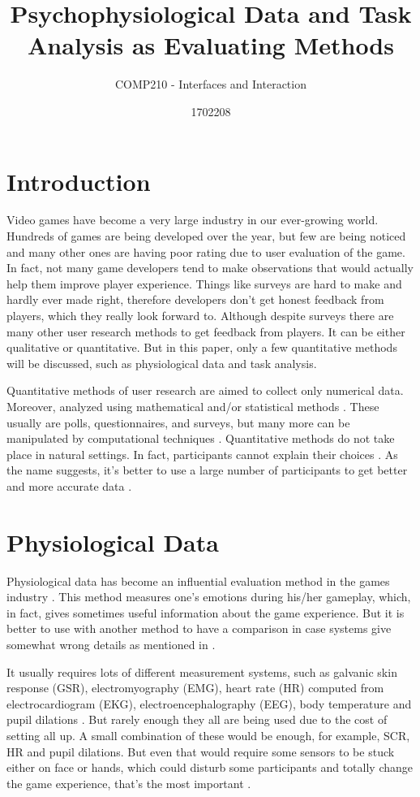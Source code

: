 \documentclass{scrartcl}
\title{Psychophysiological Data and Task Analysis as Evaluating Methods}
\subtitle{COMP210 - Interfaces and Interaction}
\author{1702208}
\begin{document}
\maketitle

\section{Introduction}

Video games have become a very large industry in our ever-growing world. Hundreds of games are being developed over the year, but few are being noticed and many other ones are having poor rating due to user evaluation of the game. In fact, not many game developers tend to make observations that would actually help them improve player experience. Things like surveys are hard to make and hardly ever made right, therefore developers don't get honest feedback from players, which they really look forward to. Although despite surveys there are many other user research methods to get feedback from players. It can be either qualitative or quantitative. But in this paper, only a few quantitative methods will be discussed, such as physiological data and task analysis.

Quantitative methods of user research are aimed to collect only numerical data. Moreover, analyzed using mathematical and/or statistical methods \cite {quantqual}. These usually are polls, questionnaires, and surveys, but many more can be manipulated by computational techniques \cite{quantmeth}. Quantitative methods do not take place in natural settings. In fact, participants cannot explain their choices \cite{carr1994strengths}. As the name suggests, it's better to use a large number of participants to get better and more accurate data \cite{denscombe2014good}.

\section{Physiological Data}

Physiological data has become an influential evaluation method in the games industry \cite{mandryk2008physiological}. This method measures one's emotions during his/her gameplay, which, in fact, gives sometimes useful information about the game experience. But it is better to use with another method to have a comparison in case systems give somewhat wrong details as mentioned in \cite{tan2014combining}.

It usually requires lots of different measurement systems, such as galvanic skin response (GSR), electromyography (EMG), heart rate (HR) computed from electrocardiogram (EKG), electroencephalography (EEG), body temperature and pupil dilations \cite{tan2014combining} \cite{nacke2013introduction}. But rarely enough they all are being used due to the cost of setting all up. A small combination of these would be enough, for example, SCR, HR and pupil dilations. But even that would require some sensors to be stuck either on face or hands, which could disturb some participants and totally change the game experience, that's the most important \cite{tan2014combining}. 
\end{document}
